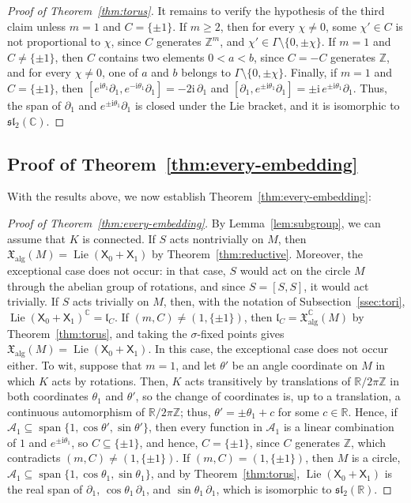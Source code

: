 \documentclass{article}
\newcommand{\R}{\mathbb{R}}
\newcommand{\C}{\mathbb{C}}
\newcommand{\Z}{\mathbb{Z}}
\newcommand{\xalg}{\mathfrak X_{\mathrm{alg}}}
\newcommand{\sX}{\mathsf{X}}
\theoremstyle{definition}
\theoremstyle{plain}
\begin{document}
\begin{proof}[Proof of Theorem~\ref{thm:torus}]
It remains to verify the hypothesis of the third claim unless $m=1$ and $C=\{\pm1\}$.
If $m\geq2$, then for every $\chi\neq0$, some $\chi'\in C$ is not proportional to $\chi$, since $C$ generates $\Z^m$, and $\chi'\in\Gamma\setminus\{0,\pm\chi\}$.
If $m=1$ and $C\neq\{\pm1\}$, then $C$ contains two elements $0<a<b$, since $C=-C$ generates $\Z$, and for every $\chi\neq0$, one of $a$ and $b$ belongs to $\Gamma\setminus\{0,\pm\chi\}$.
Finally, if $m=1$ and $C=\{\pm1\}$, then $[e^{\mathrm{i}\theta_1}\partial_1,e^{-\mathrm{i}\theta_1}\partial_1]=-2\mathrm{i}\,\partial_1$ and $[\partial_1,e^{\pm\mathrm{i}\theta_1}\partial_1]=\pm\mathrm{i}\,e^{\pm\mathrm{i}\theta_1}\partial_1$. Thus,
  the span of $\partial_1$ and $e^{\pm\mathrm{i}\theta_1}\partial_1$ is closed under the Lie bracket, and it is isomorphic to $\mathfrak{sl}_2(\C)$.
\end{proof}

\subsection{Proof of Theorem~\ref{thm:every-embedding}}\label{ssec:proof-every-embedding}

With the results above, we now establish Theorem~\ref{thm:every-embedding}:

\begin{proof}[Proof of Theorem~\ref{thm:every-embedding}]
By Lemma~\ref{lem:subgroup}, we can assume that $K$ is connected.
If $S$ acts nontrivially on $M$, then $\xalg(M)=\operatorname{Lie}(\sX_0+\sX_1)$ by Theorem~\ref{thm:reductive}.
Moreover, the exceptional case does not occur: in that case, $S$ would act on the circle $M$ through the abelian group of rotations,
    and since $S=[S,S]$, it would act trivially.
If $S$ acts trivially on $M$, then, with the notation of Subsection~\ref{ssec:tori}, $\operatorname{Lie}(\sX_0+\sX_1)^\C=\mathfrak l_C$.
If $(m,C)\neq (1,\{\pm1\})$, then $\mathfrak l_C=\xalg^\C (M)$ by Theorem~\ref{thm:torus}, and taking the $\sigma$-fixed points gives $\xalg(M)=\operatorname{Lie}(\sX_0+\sX_1)$.
In this case, the exceptional case does not occur either.
To wit, suppose that $m=1$, and let $\theta'$ be an angle coordinate on $M$ in which $K$ acts by rotations.
Then, $K$ acts transitively by translations of $\R/2\pi\Z$ in both coordinates $\theta_1$ and $\theta'$, so the change of coordinates is, up to a translation, a continuous automorphism of $\R/2\pi\Z$; thus, $\theta'=\pm\theta_1+c$ for some $c\in\R$.
Hence, if $\mathcal A_1\subseteq\operatorname{span}\{1,\cos\theta',\sin\theta'\}$, then every function in $\mathcal A_1$ is a linear combination of $1$ and $e^{\pm\mathrm{i}\theta_1}$, so $C\subseteq\{\pm1\}$, and hence, $C=\{\pm1\}$, since $C$ generates $\Z$, which contradicts $(m,C)\neq(1,\{\pm1\})$.
If $(m,C)=(1,\{\pm1\})$, then $M$ is a circle, $\mathcal A_1\subseteq\operatorname{span}\{1,\cos\theta_1,\sin\theta_1\}$, and by Theorem~\ref{thm:torus}, $\operatorname{Lie}(\sX_0+\sX_1)$ is the real span of $\partial_1$, $\cos\theta_1\,\partial_1$, and $\sin\theta_1\,\partial_1$, which is isomorphic to $\mathfrak{sl}_2(\R)$.
\end{proof}
\end{document}
